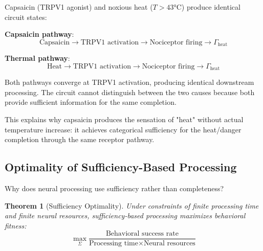\documentclass[aps,prd,twocolumn,superscriptaddress,floatfix,nofootinbib]{revtex4-2}
\newtheorem{theorem}{Theorem}[section]
\theoremstyle{remark}
\begin{document}
\begin{example}
\label{ex:trpv1_equivalence}
Capsaicin (TRPV1 agonist) and noxious heat ($T > 43°$C) produce identical circuit states:

\textbf{Capsaicin pathway}:
$$
\text{Capsaicin} \to \text{TRPV1 activation} \to \text{Nociceptor firing} \to \Gamma_{\text{heat}}
$$

\textbf{Thermal pathway}:
$$
\text{Heat} \to \text{TRPV1 activation} \to \text{Nociceptor firing} \to \Gamma_{\text{heat}}
$$

Both pathways converge at TRPV1 activation, producing identical downstream processing. The circuit cannot distinguish between the two causes because both provide sufficient information for the same completion.

This explains why capsaicin produces the sensation of "heat" without actual temperature increase: it achieves categorical sufficiency for the heat/danger completion through the same receptor pathway.
\end{example}

\subsection{Optimality of Sufficiency-Based Processing}

Why does neural processing use sufficiency rather than completeness?

\begin{theorem}[Sufficiency Optimality]
\label{thm:sufficiency_optimal}
Under constraints of finite processing time and finite neural resources, sufficiency-based processing maximizes behavioral fitness:
\begin{equation}
\max_{\Sigma} \frac{\text{Behavioral success rate}}{\text{Processing time} \times \text{Neural resources}}
\end{equation}
\end{theorem}
\end{document}
